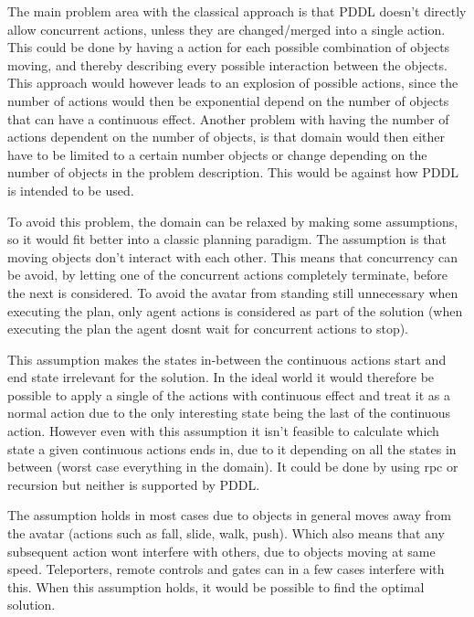 		The main problem area with the classical approach is that PDDL doesn't directly allow concurrent actions, unless they are changed/merged into a single action. This could be done by having a action for each possible combination of objects moving, and thereby describing every possible interaction between the objects. This approach would however leads to an explosion of possible actions, since the number of actions would then be exponential depend on the number of objects that can have a continuous effect. %
		Another problem with having the number of actions dependent on the number of objects, is that domain would then either have to be limited to a certain number objects or change depending on the number of objects in the problem description. This would be against how PDDL is intended to be used. 
	
		To avoid this problem, the domain can be relaxed by making some assumptions, so it would fit better into a classic planning paradigm. The assumption is that moving objects don't interact with each other. This means that concurrency can be avoid, by letting one of the concurrent actions completely terminate, before the next is considered. To avoid the avatar from standing still unnecessary when executing the plan, only agent actions is considered as part of the solution (when executing the plan the agent dosnt wait for concurrent actions to stop).
		
		This assumption makes the states in-between the continuous actions start and end state irrelevant for the solution. In the ideal world it would therefore be possible to apply a single of the actions with continuous effect and treat it as a normal action due to the only interesting state being the last of the continuous action. However even with this assumption it isn't feasible to calculate which state a given continuous actions ends in, due to it depending on all the states in between (worst case everything in the domain). It could be done by using rpc or recursion but neither is supported by PDDL.
		
		
		The assumption holds in most cases due to objects in general moves away from the avatar (actions such as fall, slide, walk, push). Which also means that any subsequent action wont interfere with others, due to objects moving at same speed. Teleporters, remote controls and gates can in a few cases interfere with this. When this assumption holds, it would be possible to find the optimal solution.
		
